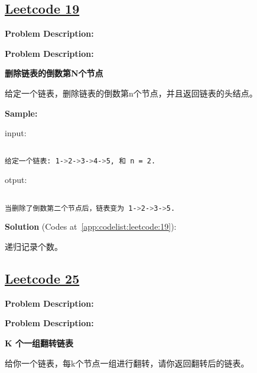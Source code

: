 \subsection{\href{https://leetcode-cn.com/}{Leetcode 19}}\label{app:problemlist:leetcode:19}

\textbf{Problem Description:}\par

\textbf{Problem Description:}\par

\textbf{删除链表的倒数第N个节点}\par

给定一个链表，删除链表的倒数第n个节点，并且返回链表的头结点。\par


\textbf{Sample:}\par

input:\par

\begin{lstlisting}[language=bash]

给定一个链表: 1->2->3->4->5, 和 n = 2.


\end{lstlisting}

otput:\par

\begin{lstlisting}[language=bash]

当删除了倒数第二个节点后，链表变为 1->2->3->5.


\end{lstlisting}

\textbf{Solution }(Codes at~\ref{app:codelist:leetcode:19}):\par

递归记录个数。\par



\subsection{\href{https://leetcode-cn.com/}{Leetcode 25}}\label{app:problemlist:leetcode:25}

\textbf{Problem Description:}\par

\textbf{Problem Description:}\par

\textbf{K 个一组翻转链表}\par

给你一个链表，每k个节点一组进行翻转，请你返回翻转后的链表。\par

